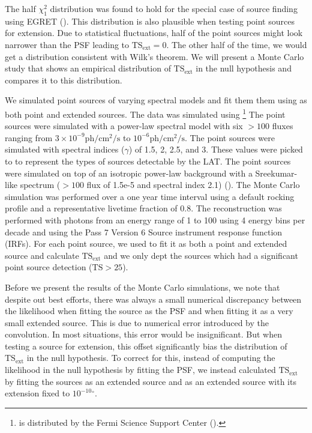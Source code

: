 \documentclass[12pt,preprint]{aastex}
\newcommand{\mev}{\text{MeV}\xspace}
\newcommand{\gev}{\text{GeV}\xspace}
\newcommand{\ph}{\text{ph}\xspace}
\newcommand{\cm}{\text{cm}\xspace}
\renewcommand{\sec}{\text{s}\xspace}
\newcommand{\tsext}{{\ensuremath{\text{TS}_\text{ext}}}\xspace}
\newcommand{\ts}{\text{TS}\xspace}
\renewcommand{\deg}{\ensuremath{^\circ}\xspace}
\newcommand{\pointlike}{\text{\em pointlike}\xspace}
\newcommand{\gtobssim}{\text{\em gtobssim}\xspace}
\begin{document}
The half $\chi^2_1$ distribution was found to hold for the special case
of source finding using EGRET (\cite{mattox_egret}). This distribution
is also plausible when testing point sources for extension. Due to
statistical fluctuations, half of the point sources might look narrower
than the PSF leading to $\tsext=0$. The other half of the time, we would
get a distribution consistent with Wilk's theorem. We will present a
Monte Carlo study that shows an empirical distribution of \tsext in the
null hypothesis and compares it to this distribution.

We simulated point sources of varying spectral models and fit them
them using \pointlike as both point and extended sources. The data was
simulated using \gtobssim\footnote{\gtobssim is distributed
by the Fermi Science Support Center (\cite{fssc}).}
The point sources were simulated with a power-law spectral model with
six $>100$ \mev fluxes ranging from $3\times 10^{-9} \ph/\cm^2/\sec$ to
$10^{-6} \ph/\cm^2/\sec$.  The point sources were simulated with spectral
indices ($\gamma$) of 1.5, 2, 2.5, and 3.  These values were picked to
to represent the types of sources detectable by the LAT.  The point
sources were simulated on top of an isotropic power-law background
with a Sreekumar-like spectrum ($>100$ \mev flux of 1.5e-5 and spectral
index 2.1) (\cite{sreekumar_isotropic}).  The Monte Carlo simulation was
performed over a one year time interval using a default rocking profile
and a representative livetime fraction of 0.8.  The reconstruction was
performed with photons from an energy range of 1 \gev to 100 \gev using 4
energy bins per decade and using the Pass 7 Version 6 Source instrument
response function (IRFs).  For each point source, we used \pointlike
to fit it as both a point and extended source and calculate \tsext and
we only dept the sources which had a significant point source detection
($\ts>25$).

Before we present the results of the Monte Carlo simulations, we note
that despite out best efforts, there was always a small numerical
discrepancy between the likelihood when fitting the source as the PSF
and when fitting it as a very small extended source. This is due to
numerical error introduced by the convolution.  In most situations, this
error would be insignificant. But when testing a source for extension,
this offset significantly bias the distribution of \tsext in the null
hypothesis. To correct for this, instead of computing the likelihood in
the null hypothesis by fitting the PSF, we instead calculated \tsext by
fitting the sources as an extended source and as an extended source with
its extension fixed to ${10^{-10}}\deg$.
\end{document}
